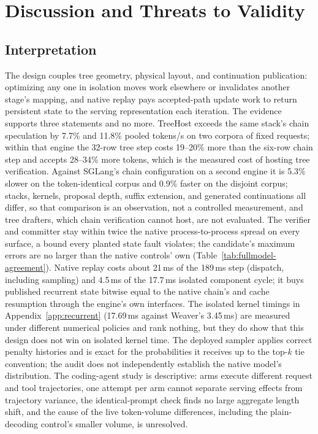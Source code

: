 \documentclass[sigconf,anonymous,review]{acmart}
\newcommand{\sys}{TreeHost}
\begin{document}
\section{Discussion and Threats to Validity}
\label{sec:discussion}
\subsection{Interpretation}
The design couples tree geometry, physical layout, and continuation publication: optimizing any one in isolation moves work elsewhere or invalidates another stage's mapping, and native replay pays accepted-path update work to return persistent state to the serving representation each iteration. The evidence supports three statements and no more. \sys{} exceeds the same stack's chain speculation by 7.7\% and 11.8\% pooled tokens/s on two corpora of fixed requests; within that engine the 32-row tree step costs 19--20\% more than the six-row chain step and accepts 28--34\% more tokens, which is the measured cost of hosting tree verification. Against SGLang's chain configuration on a second engine it is 5.3\% slower on the token-identical corpus and 0.9\% faster on the disjoint corpus; stacks, kernels, proposal depth, suffix extension, and generated continuations all differ, so that comparison is an observation, not a controlled measurement, and tree drafters, which chain verification cannot host, are not evaluated. The verifier and committer stay within twice the native process-to-process spread on every surface, a bound every planted state fault violates; the candidate's maximum errors are no larger than the native controls' own (Table~\ref{tab:fullmodel-agreement}). Native replay costs about 21\,ms of the 189\,ms step (dispatch, including sampling) and 4.5\,ms of the 17.7\,ms isolated component cycle; it buys published recurrent state bitwise equal to the native chain's and cache resumption through the engine's own interfaces. The isolated kernel timings in Appendix~\ref{app:recurrent} (17.69\,ms against Weaver's 3.45\,ms) are measured under different numerical policies and rank nothing, but they do show that this design does not win on isolated kernel time. The deployed sampler applies correct penalty histories and is exact for the probabilities it receives up to the top-$k$ tie convention; the audit does not independently establish the native model's distribution. The coding-agent study is descriptive: arms execute different request and tool trajectories, one attempt per arm cannot separate serving effects from trajectory variance, the identical-prompt check finds no large aggregate length shift, and the cause of the live token-volume differences, including the plain-decoding control's smaller volume, is unresolved.
\end{document}
